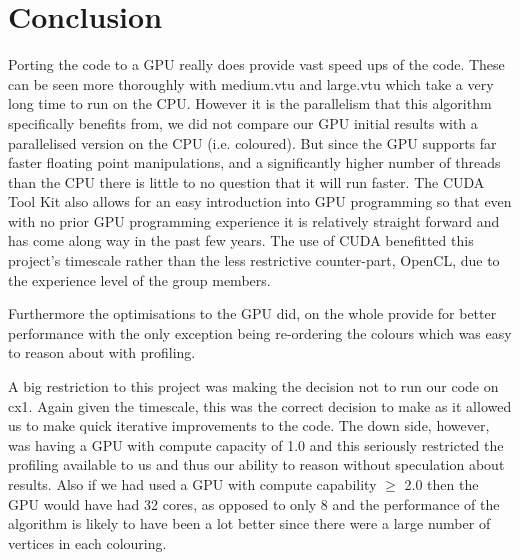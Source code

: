 \section*{Conclusion}
Porting the code to a GPU really does provide vast speed ups of the code. These can be seen more thoroughly with medium.vtu and large.vtu which take a very long time to run on the CPU.
However it is the parallelism that this algorithm specifically benefits from, we did not compare our GPU initial results with a parallelised version on the CPU (i.e. coloured). But since the GPU supports far faster floating point manipulations, and a significantly higher number of threads than the CPU there is little to no question that it will run faster.
The CUDA Tool Kit also allows for an easy introduction into GPU programming so that even with no prior GPU programming experience it is relatively straight forward and has come along way in the past few years. The use of CUDA benefitted this project's timescale rather than the less restrictive counter-part, OpenCL, due to the experience level of the group members.

Furthermore the optimisations to the GPU did, on the whole provide for better performance with the only exception being re-ordering the colours which was easy to reason about with profiling.

A big restriction to this project was making the decision not to run our code on cx1. Again given the timescale, this was the correct decision to make as it allowed us to make quick iterative improvements to the code. The down side, however, was having a GPU with compute capacity of 1.0 and this seriously restricted the profiling available to us and thus our ability to reason without speculation about results.
Also if we had used a GPU with compute capability $\ge$ 2.0 then the GPU would have had 32 cores\cite{compute_2.0}, as opposed to only 8 and the performance of the algorithm is likely to have been a lot better since there were a large number of vertices in each colouring.
